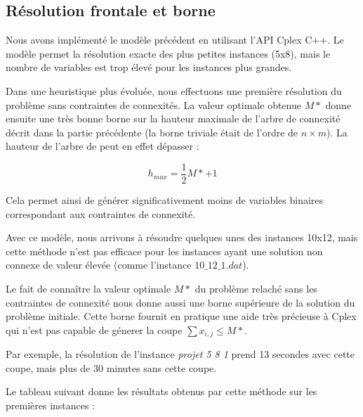 \documentclass[12pt,a4paper]{article}
\begin{document}
\subsection{Résolution frontale et borne}

Nous avons implémenté le modèle précédent en utilisant l'API Cplex C++. Le modèle permet la résolution exacte des plus petites instances (5x8), mais le nombre de variables est trop élevé pour les instances plus grandes.

Dans une heuristique plus évoluée, nous effectuons une première résolution du problème sans contraintes de connexités. La valeur optimale obtenue $M*$ donne ensuite une très bonne borne sur la hauteur maximale de l'arbre de connexité décrit dans la partie précédente (la borne triviale était de l'ordre de $n \times m$). La hauteur de l'arbre de peut en effet dépasser :

\[ h_{max} = \dfrac{1}{2} M* +1\]

 Cela permet ainsi de générer significativement moins de variables binaires correspondant aux contraintes de connexité.

Avec ce modèle, nous arrivons à résoudre quelques unes des instances 10x12, mais cette méthode n'est pas efficace pour les instances ayant une solution non connexe de valeur élevée (comme l'instance $10\_12\_1.dat$).

\vspace{0.5cm}

Le fait de connaître la valeur optimale $M*$ du problème relaché sans les contraintes de connexité nous donne aussi une borne supérieure de la solution du problème initiale. Cette borne fournit en pratique une aide très précieuse à Cplex qui n'est pas capable de génerer la coupe $\sum x_{i,j} \leq M* $.

Par exemple, la résolution de l'instance \textit{projet 5 8 1} prend 13 secondes avec cette coupe, mais plus de 30 minutes sans cette coupe.


Le tableau suivant donne les résultats obtenus par cette méthode sur les premières instances :
\end{document}
